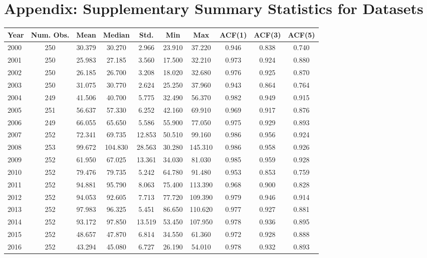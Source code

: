 \documentclass[12pt]{article}
\begin{document}
	\section{Appendix: Supplementary Summary Statistics for Datasets}
	\begin{table}[H]
		\small
		\centering
		\begin{tabular}{l|c c c c c c c c c}
			\toprule
			Year & Num. Obs. & Mean & Median & Std. & Min & Max & ACF(1) & ACF(3) & ACF(5) \\
			\midrule
			2000 & 250 & 30.379 & 30.270 & 2.966 & 23.910 & 37.220 & 0.946 & 0.838 & 0.740 \\
			2001 & 250 & 25.983 & 27.185 & 3.560 & 17.500 & 32.210 & 0.973 & 0.924 & 0.880 \\
			2002 & 250 & 26.185 & 26.700 & 3.208 & 18.020 & 32.680 & 0.976 & 0.925 & 0.870 \\
			2003 & 250 & 31.075 & 30.770 & 2.624 & 25.250 & 37.960 & 0.943 & 0.864 & 0.764 \\
			2004 & 249 & 41.506 & 40.700 & 5.775 & 32.490 & 56.370 & 0.982 & 0.949 & 0.915 \\
			2005 & 251 & 56.637 & 57.330 & 6.252 & 42.160 & 69.910 & 0.969 & 0.917 & 0.876 \\
			2006 & 249 & 66.055 & 65.650 & 5.586 & 55.900 & 77.050 & 0.975 & 0.929 & 0.893 \\
			2007 & 252 & 72.341 & 69.735 & 12.853 & 50.510 & 99.160 & 0.986 & 0.956 & 0.924 \\
			2008 & 253 & 99.672 & 104.830 & 28.563 & 30.280 & 145.310 & 0.986 & 0.958 & 0.926 \\
			2009 & 252 & 61.950 & 67.025 & 13.361 & 34.030 & 81.030 & 0.985 & 0.959 & 0.928 \\
			2010 & 252 & 79.476 & 79.735 & 5.242 & 64.780 & 91.480 & 0.953 & 0.853 & 0.759 \\
			2011 & 252 & 94.881 & 95.790 & 8.063 & 75.400 & 113.390 & 0.968 & 0.900 & 0.828 \\
			2012 & 252 & 94.053 & 92.605 & 7.713 & 77.720 & 109.390 & 0.979 & 0.946 & 0.914 \\
			2013 & 252 & 97.983 & 96.325 & 5.451 & 86.650 & 110.620 & 0.977 & 0.927 & 0.881 \\
			2014 & 252 & 93.172 & 97.850 & 13.519 & 53.450 & 107.950 & 0.978 & 0.936 & 0.895 \\
			2015 & 252 & 48.657 & 47.870 & 6.814 & 34.550 & 61.360 & 0.972 & 0.928 & 0.888 \\
			2016 & 252 & 43.294 & 45.080 & 6.727 & 26.190 & 54.010 & 0.978 & 0.932 & 0.893 \\

\end{tabular}
\end{table}
\end{document}
